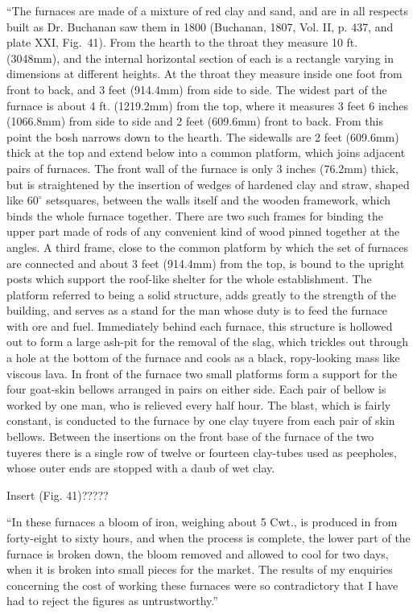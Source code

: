 ``The furnaces are made of a mixture of red clay and sand, and are in all respects built as Dr. Buchanan saw them in 1800 (Buchanan, 1807, Vol. II, p. 437, and plate XXI, Fig.~41). From the hearth to the throat they measure 10 ft. (3048mm), and the internal horizontal section of each is a rectangle varying in dimensions at different heights. At the throat they measure inside one foot from front to back, and 3 feet (914.4mm) from side to side. The widest part of the furnace is about 4 ft. (1219.2mm) from the top, where it measures 3 feet 6 inches (1066.8mm) from side to side and 2 feet (609.6mm) front to back. From this point the bosh narrows down to the hearth. The sidewalls are 2 feet (609.6mm) thick at the top and extend below into a common platform, which joins adjacent pairs of furnaces. The front wall of the furnace is only 3 inches (76.2mm) thick, but is straightened by the insertion of wedges of hardened clay and straw, shaped like $60^\circ$ setsquares, between the walls itself and the wooden framework, which binds the whole furnace together. There are two such frames for binding the upper part made of rods of any convenient kind of wood pinned together at the angles. A third frame, close to the common platform by which the set of furnaces are connected and about 3 feet (914.4mm) from the top, is bound to the upright posts which support the roof-like shelter for the whole establishment. The platform referred to being a solid structure, adds greatly to the strength of the building, and serves as a stand for the man whose duty is to feed the furnace with ore and fuel. Immediately behind each furnace, this structure is hollowed out to form a large ash-pit for the removal of the slag, which trickles out through a hole at the bottom of the furnace and cools as a black, ropy-looking mass like viscous lava. In front of the furnace two small platforms form a support for the four goat-skin bellows arranged in pairs on either side. Each pair of bellow is worked by one man, who is relieved every half hour. The blast, which is fairly constant, is conducted to the furnace by one clay tuyere from each pair of skin bellows. Between the insertions on the front base of the furnace of the two tuyeres there is a single row of twelve or fourteen clay-tubes used as peepholes, whose outer ends are stopped with a daub of wet clay.

Insert (Fig. 41)?????

``In these furnaces a bloom of iron, weighing about 5 Cwt., is produced in from forty-eight to sixty hours, and when the process is complete, the lower part of the furnace is broken down, the bloom removed and allowed to cool for two days, when it is broken into small pieces for the market. The results of my enquiries concerning the cost of working these furnaces were so contradictory that I have had to reject the figures as untrustworthy.”

